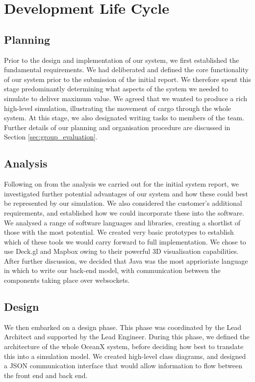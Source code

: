 \section{Development Life Cycle}

\subsection{Planning}

Prior to the design and implementation of our system, we first established the fundamental requirements. We had deliberated and defined the core functionality of our system prior to the submission of the initial report. We therefore spent this stage predominantly determining what aspects of the system we needed to simulate to deliver maximum value. We agreed that we wanted to produce a rich high-level simulation, illustrating the movement of cargo through the whole system. At this stage, we also designated writing tasks to members of the team. Further details of our planning and organisation procedure are discussed in Section \ref{sec:group_evaluation}.

\subsection{Analysis}

Following on from the analysis we carried out for the initial system report, we investigated further potential advantages of our system and how these could best be represented by our simulation. We also considered the customer's additional requirements, and established how we could incorporate these into the software. We analysed a range of software languages and libraries, creating a shortlist of those with the most potential. We created very basic prototypes to establish which of these tools we would carry forward to full implementation. We chose to use Deck.gl and Mapbox owing to their powerful 3D visualisation capabilities. After further discussion, we decided that Java was the most apprioriate language in which to write our back-end model, with communication between the components taking place over websockets. 

\subsection{Design}

We then embarked on a design phase. This phase was coordinated by the Lead Architect and supported by the Lead Engineer. During this phase, we defined the architecture of the whole OceanX system, before deciding how best to translate this into a simulation model. We created high-level class diagrams, and designed a JSON communication interface that would allow information to flow between the front end and back end. 

